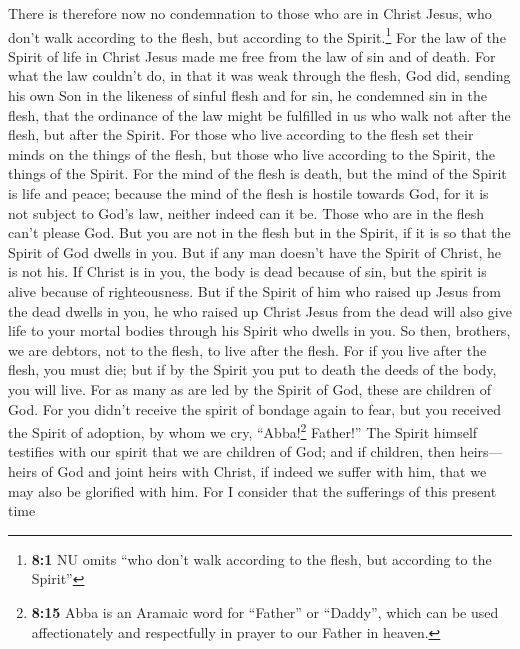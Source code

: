  There is therefore now no condemnation to those who are
in Christ Jesus, who don't walk according to the flesh, but according to
the Spirit.\footnote{\textbf{8:1} NU omits ``who don't walk according to
  the flesh, but according to the Spirit''}  For the law
of the Spirit of life in Christ Jesus made me free from the law of sin
and of death.  For what the law couldn't do, in that it
was weak through the flesh, God did, sending his own Son in the likeness
of sinful flesh and for sin, he condemned sin in the flesh,
 that the ordinance of the law might be fulfilled in us
who walk not after the flesh, but after the Spirit.  For
those who live according to the flesh set their minds on the things of
the flesh, but those who live according to the Spirit, the things of the
Spirit.  For the mind of the flesh is death, but the mind
of the Spirit is life and peace;  because the mind of the
flesh is hostile towards God, for it is not subject to God's law,
neither indeed can it be.  Those who are in the flesh
can't please God.  But you are not in the flesh but in the
Spirit, if it is so that the Spirit of God dwells in you. But if any man
doesn't have the Spirit of Christ, he is not his.  If
Christ is in you, the body is dead because of sin, but the spirit is
alive because of righteousness.  But if the Spirit of him
who raised up Jesus from the dead dwells in you, he who raised up Christ
Jesus from the dead will also give life to your mortal bodies through
his Spirit who dwells in you.  So then, brothers, we are
debtors, not to the flesh, to live after the flesh.  For
if you live after the flesh, you must die; but if by the Spirit you put
to death the deeds of the body, you will live.  For as
many as are led by the Spirit of God, these are children of God.
 For you didn't receive the spirit of bondage again to
fear, but you received the Spirit of adoption, by whom we cry,
``Abba!\footnote{\textbf{8:15} Abba is an Aramaic word for ``Father'' or
  ``Daddy'', which can be used affectionately and respectfully in prayer
  to our Father in heaven.} Father!''  The Spirit himself
testifies with our spirit that we are children of God; 
and if children, then heirs---heirs of God and joint heirs with Christ,
if indeed we suffer with him, that we may also be glorified with him.
 For I consider that the sufferings of this present time
